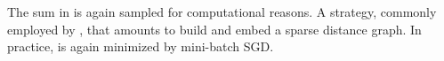 The sum in  is again sampled for computational reasons.
A strategy, commonly employed by , that amounts to build and embed a sparse distance graph.
In practice,  is again minimized by mini-batch SGD.

